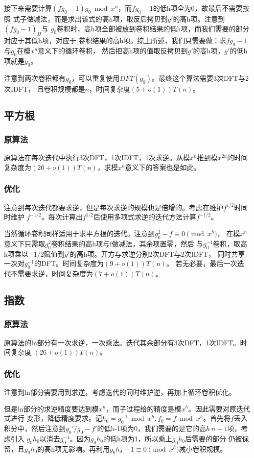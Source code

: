 接下来需要计算$(fg_0-1)g_0\bmod{x^n}$，而$fg_0-1$的低h项全为0，故最后不需要按照
式子做减法，而是求出该式的高h项，取反后拷贝到$g'$的高h项。注意到$(fg_0-1)_H$与
$g_0$卷积时，高h项全部被放到卷积结果的低h项，而我们需要的部分对应于其低h项，对应于
卷积结果的高h项。综上所述，我们只需要做：求$fg_0-1$与$g_0$在模$x^n$意义下的循环卷积，
然后把高h项的值取反拷贝到$g'$的高h项，$g'$的低h项就是$g_0$。

注意到两次卷积都有$g_0$，可以重复使用$DFT(g_0)$。最终这个算法需要3次DFT与2次IDFT，
且卷积规模都是$n$，时间复杂度$(5+o(1))T(n)$。
\subsection{平方根}
\subsubsection{原算法}
原算法在每次迭代中执行3次DFT，1次IDFT，1次求逆。从模$x^n$推到模$x^{2n}$的时间
复杂度为$(20+o(1))T(n)$，求模$x^n$意义下的答案也是如此。
\subsubsection{优化}
注意到每次迭代都要求逆，但是每次求逆的规模也是倍增的。考虑在维护$f^{1/2}$时同时维护
$f^{-1/2}$。每次计算出$f^{1/2}$后使用多项式求逆的迭代方法计算$f^{-1/2}$。

当然循环卷积同样适用于求平方根的迭代。注意到$g_0^2-f\equiv 0 \pmod{x^h}$，
在模$x^n$意义下只需取$g_0^2$卷积结果的高h项与f做减法，其余项置零，然后
与$g^{-1}_0$卷积，取高h项乘以$-1/2$赋值到$g'$的高h项。开方与求逆分别2次DFT与2次IDFT，
同时共享一次对$g_0^{-1}$的DFT。时间复杂度为$(9+o(1))T(n)$。
若无必要，最后一次迭代不需要求逆，时间复杂度为$(7+o(1))T(n)$。
\subsection{指数}
\subsubsection{原算法}
原算法的ln部分有一次求逆，一次乘法。迭代其余部分有3次DFT，1次IDFT。时间复杂度
$(26+o(1))T(n)$。
\subsubsection{优化}
注意到ln部分需要用到求逆，考虑迭代的同时维护逆，再加上循环卷积优化。

但是ln部分的求逆精度要达到模$x^n$，而子过程给的精度是模$x^h$。因此需要对原迭代式进行
变形，降低精度要求。记$h_0=g_0^{-1}\bmod{x^h},f_0=f\bmod{x^h}$。首先将$f$丢入
积分中，然后注意到$g_0'/g_0-f'$的低h-1项为0，我们需要的是它的高$h~n-1$项，考虑引入
$g_0h_0$以消去$g_0^{-1}$。因为$g_0h_0$的低h项为1，所以乘上$g_0h_0$后需要的部分
仍被保留，且$g_0h_0$的高h项无影响。再利用$g_0h_0-1\equiv 0 \pmod{x^h}$减小卷积规模。


